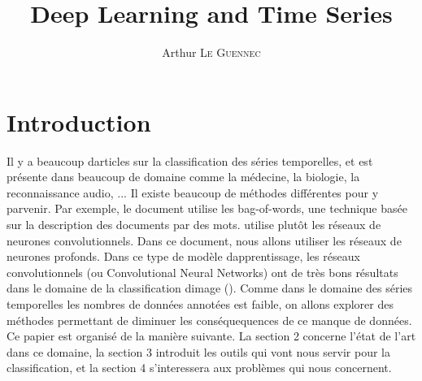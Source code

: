 \documentclass[11pt]{sdm}
\title{Deep Learning and Time Series}
\author{Arthur \textsc{Le Guennec}}
\begin{document}
\maketitle


\section{Introduction}

Il y a beaucoup d\textquotesingle articles sur la classification des s\'eries temporelles, et est présente dans beaucoup de domaine comme la m\'edecine, la biologie, la reconnaissance audio, ... Il existe beaucoup de m\'ethodes diff\'erentes pour y parvenir. Par exemple, le document \cite{bailly2015bag} utilise les bag-of-words, une technique bas\'ee sur la description des documents par des mots. \cite{zheng2014time} utilise plut\^ot les r\'eseaux de neurones convolutionnels.
Dans ce document, nous allons utiliser les r\'eseaux de neurones profonds. Dans ce type de mod\`ele d\textquotesingle apprentissage, les r\'eseaux convolutionnels (ou Convolutional Neural Networks) ont de tr\`es bons r\'esultats dans le domaine de la classification d\textquotesingle image (\cite{chatfield2014return}).
Comme dans le domaine des s\'eries temporelles les nombres de donn\'ees annot\'ees est faible, on allons explorer des m\'ethodes permettant de diminuer les cons\'equequences de ce manque de donn\'ees. \\
Ce papier est organis\'e de la mani\`ere suivante. La section 2 concerne l'\'etat de l'art dans ce domaine, la section 3 introduit les outils qui vont nous servir pour la classification, et la section 4 s'interessera aux probl\`emes qui nous concernent.

 
\end{document}
